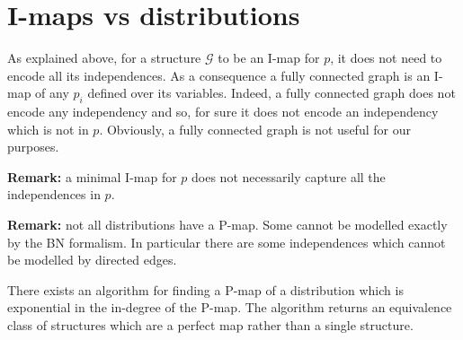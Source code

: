 \section{I-maps vs distributions}
As explained above, for a structure $\mathcal{G}$ to be an I-map for $p$, it
does not need to encode all its independences. As a consequence a fully connected
graph is an I-map of any $p_{i}$ defined over its variables. Indeed, a fully connected
graph does not encode any independency and so, for sure it does not encode an
independency which is not in $p$. Obviously, a fully connected graph is not
useful for our purposes.


\textbf{Remark:} a minimal I-map for $p$ does not necessarily capture all the independences
in $p$.


\textbf{Remark:} not all distributions have a P-map. Some cannot be modelled exactly
by the BN formalism. In particular there are some independences which cannot be
modelled by directed edges.
\newline

There exists an algorithm for finding a P-map of a distribution which is
exponential in the in-degree of the P-map. The algorithm returns an equivalence class
of structures which are a perfect map rather than a single structure.

